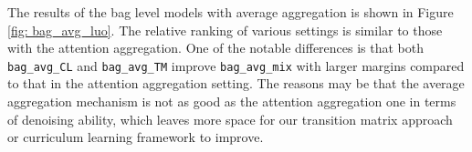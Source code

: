 The results of the bag level models with average aggregation is shown in Figure \ref{fig: bag_avg_luo}. The relative ranking of various settings is similar to those with the attention aggregation.
One of the notable differences is that both \texttt{bag\_avg\_CL} and \texttt{bag\_avg\_TM} improve \texttt{bag\_avg\_mix} with larger margins compared to that in the attention aggregation setting. The reasons may be that the average aggregation mechanism is not as good as the attention aggregation one in terms of denoising ability, which leaves more space for our transition matrix approach or curriculum learning framework to improve.

